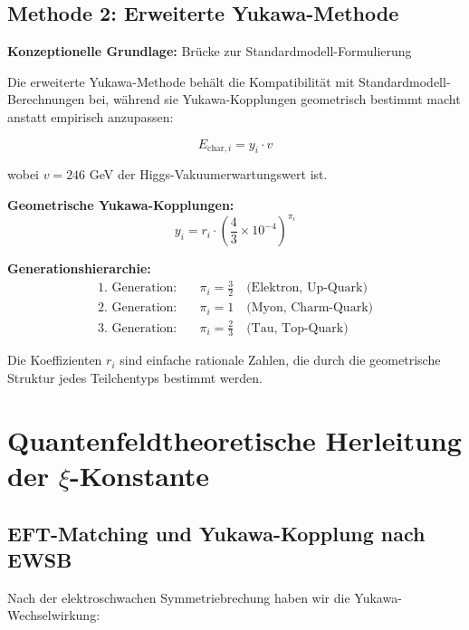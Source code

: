 	\subsection{Methode 2: Erweiterte Yukawa-Methode}
	\label{subsec:extended_yukawa_method}
	
	\textbf{Konzeptionelle Grundlage:} Brücke zur Standardmodell-Formulierung
	
	Die erweiterte Yukawa-Methode behält die Kompatibilität mit Standardmodell-Berechnungen bei, während sie Yukawa-Kopplungen geometrisch bestimmt macht anstatt empirisch anzupassen:
	
	\begin{equation}
		E_{\text{char},i} = y_i \cdot v
		\label{eq:yukawa_mass_formula}
	\end{equation}
	
	wobei $v = 246$ GeV der Higgs-Vakuumerwartungswert ist.
	
	\textbf{Geometrische Yukawa-Kopplungen:}
	\begin{equation}
		\boxed{y_i = r_i \cdot \left(\frac{4}{3} \times 10^{-4}\right)^{\pi_i}}
		\label{eq:geometric_yukawa}
	\end{equation}
	
	\textbf{Generationshierarchie:}
	\begin{align}
		\text{1. Generation:} \quad &\pi_i = \frac{3}{2} \quad \text{(Elektron, Up-Quark)} \\
		\text{2. Generation:} \quad &\pi_i = 1 \quad \text{(Myon, Charm-Quark)} \\
		\text{3. Generation:} \quad &\pi_i = \frac{2}{3} \quad \text{(Tau, Top-Quark)}
	\end{align}
	
	Die Koeffizienten $r_i$ sind einfache rationale Zahlen, die durch die geometrische Struktur jedes Teilchentyps bestimmt werden.
	
	\section{Quantenfeldtheoretische Herleitung der $\xi$-Konstante}
	\label{sec:qft_herleitung}
	
	\subsection{EFT-Matching und Yukawa-Kopplung nach EWSB}
	\label{subsec:eft_matching}
	
	Nach der elektroschwachen Symmetriebrechung haben wir die Yukawa-Wechselwirkung:
	
